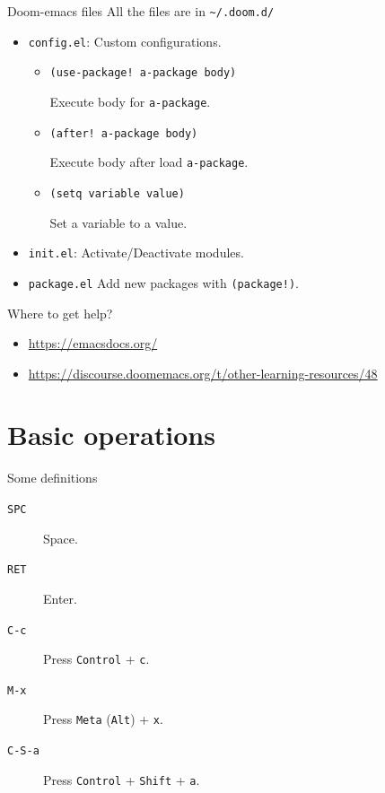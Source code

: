 \documentclass[presentation]{beamer}
\begin{document}
\begin{frame}[label={sec:org26b4cf8},fragile]{Doom-emacs files}
 All the files are in \texttt{\textasciitilde{}/.doom.d/}

\begin{itemize}
\item \texttt{config.el}: Custom configurations.
\begin{itemize}
\item \texttt{(use-package! a-package body)}

Execute body for \texttt{a-package}.
\item \texttt{(after! a-package body)}

Execute body after load \texttt{a-package}.
\item \texttt{(setq variable value)}

Set a variable to a value.
\end{itemize}

\item \texttt{init.el}: Activate/Deactivate modules.
\item \texttt{package.el} Add new packages with \texttt{(package!)}.
\end{itemize}
\end{frame}


\begin{frame}[label={sec:orgc11cd65}]{Where to get help?}
\begin{itemize}
\item \url{https://emacsdocs.org/}
\item \url{https://discourse.doomemacs.org/t/other-learning-resources/48}
\end{itemize}
\end{frame}

\section{Basic operations}
\label{sec:orgc0379df}
\begin{frame}[label={sec:org34c637c},fragile]{Some definitions}
 \begin{description}
\item[{\texttt{SPC}}] Space.
\item[{\texttt{RET} }] Enter.
\item[{\texttt{C-c} }] Press \texttt{Control} + \texttt{c}.
\item[{\texttt{M-x} }] Press \texttt{Meta} (\texttt{Alt}) + \texttt{x}.
\item[{\texttt{C-S-a} }] Press \texttt{Control} + \texttt{Shift} + \texttt{a}.
\end{description}
\end{frame}
\end{document}
